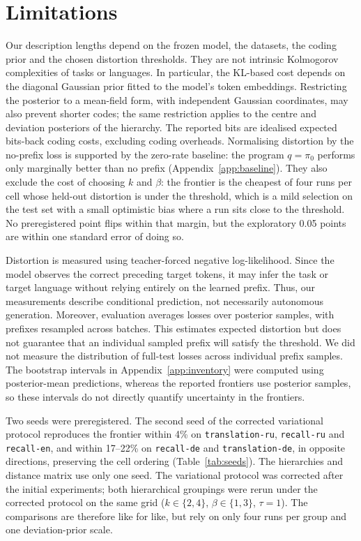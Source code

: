 \documentclass{article}
\newcommand{\cell}[1]{\texttt{#1}}
\begin{document}
\section{Limitations}\label{sec:limitations}
Our description lengths depend on the frozen model, the datasets, the coding prior and the chosen distortion thresholds. They are not intrinsic Kolmogorov complexities of tasks or languages. In particular, the KL-based cost depends on the diagonal Gaussian prior fitted to the model's token embeddings. Restricting the posterior to a mean-field form, with independent Gaussian coordinates, may also prevent shorter codes; the same restriction applies to the centre and deviation posteriors of the hierarchy. The reported bits are idealised expected bits-back coding costs, excluding coding overheads. Normalising distortion by the no-prefix loss is supported by the zero-rate baseline: the program $q=\pi_0$ performs only marginally better than no prefix (Appendix~\ref{app:baseline}). They also exclude the cost of choosing $k$ and $\beta$: the frontier is the cheapest of four runs per cell whose held-out distortion is under the threshold, which is a mild selection on the test set with a small optimistic bias where a run sits close to the threshold. No preregistered point flips within that margin, but the exploratory 0.05 points are within one standard error of doing so.

Distortion is measured using teacher-forced negative log-likelihood. Since the model observes the correct preceding target tokens, it may infer the task or target language without relying entirely on the learned prefix. Thus, our measurements describe conditional prediction, not necessarily autonomous generation. Moreover, evaluation averages losses over posterior samples, with prefixes resampled across batches. This estimates expected distortion but does not guarantee that an individual sampled prefix will satisfy the threshold. We did not measure the distribution of full-test losses across individual prefix samples. The bootstrap intervals in Appendix~\ref{app:inventory} were computed using posterior-mean predictions, whereas the reported frontiers use posterior samples, so these intervals do not directly quantify uncertainty in the frontiers.

Two seeds were preregistered. The second seed of the corrected variational protocol reproduces the frontier within 4\% on \cell{translation-ru}, \cell{recall-ru} and \cell{recall-en}, and within 17--22\% on \cell{recall-de} and \cell{translation-de}, in opposite directions, preserving the cell ordering (Table~\ref{tab:seeds}). The hierarchies and distance matrix use only one seed. The variational protocol was corrected after the initial experiments; both hierarchical groupings were rerun under the corrected protocol on the same grid ($k\in\{2,4\}$, $\beta\in\{1,3\}$, $\tau=1$). The comparisons are therefore like for like, but rely on only four runs per group and one deviation-prior scale.
\end{document}
